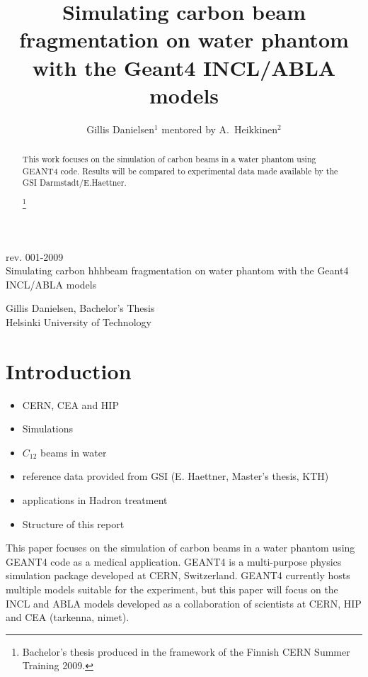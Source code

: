 \title{Simulating carbon beam fragmentation on water phantom with the Geant4 INCL/ABLA models}


\author{Gillis Danielsen$^1$ mentored by A.~Heikkinen$^2$} 
\begin{titlepage}
\pagestyle{empty}
\begin{center}
rev. 001-2009\\
\vspace{7.5 cm}
\Huge
Simulating carbon hhhbeam fragmentation on water phantom with the Geant4 INCL/ABLA models\\

\vspace{5cm}

\Large
Gillis Danielsen, Bachelor's Thesis\\
Helsinki University of Technology\\

    \vspace{0,2cm}
  \end{center}

\end{titlepage}


\begin{abstract}
This work focuses on the simulation of carbon beams in a water phantom using GEANT4 code. Results will be compared to experimental data made available by the GSI Darmstadt/E.Haettner.

\footnote{Bachelor's thesis produced in the framework of the Finnish CERN Summer Training 2009.}
\end{abstract}
\maketitle
\thispagestyle{fancy}

\tableofcontents

\section{Introduction}
\begin{itemize}
\item CERN, CEA and HIP
\item Simulations
\item $C_{12}$ beams in water
\item reference data provided from GSI (E. Haettner, Master's thesis, KTH)
\item applications in Hadron treatment
\item Structure of this report
\end{itemize}
This paper focuses on the simulation of carbon beams in a water phantom using GEANT4 code as a medical application. GEANT4 is a multi-purpose physics simulation package developed at CERN, Switzerland. GEANT4 currently hosts multiple models suitable for the experiment, but this paper will focus on the INCL and ABLA models developed as a collaboration of scientists at CERN, HIP and CEA (tarkenna, nimet).

